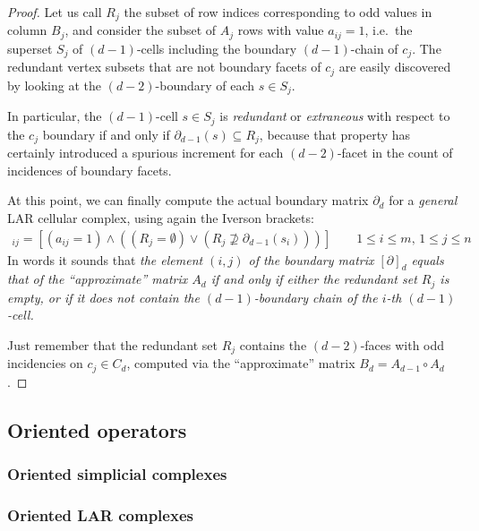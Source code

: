 \documentclass[11pt,oneside]{article}	%
\begin{document}
\begin{proof}
Let us call $R_j$ the subset of row indices corresponding to odd values in column $B_j$, and consider the subset of $A_j$ rows with value $a_{ij}=1$, i.e.~the superset $S_j$ of $(d-1)$-cells including the boundary $(d-1)$-chain of $c_j$. The redundant vertex subsets that are not boundary facets of $c_j$  are easily discovered by looking at the $(d-2)$-boundary of each $s\in S_j$.

In particular, the $(d-1)$-cell $s\in S_j$ is \emph{redundant} or \emph{extraneous} with respect to the $c_j$ boundary if and only if $\partial_{d-1}(s) \subseteq R_j$, because that property has certainly introduced a spurious increment for each $(d-2)$-facet in the count of incidences of boundary facets.

At this point, we can finally compute the actual boundary matrix $\partial_d$ for a \emph{general} LAR cellular complex, using again the Iverson brackets:
\begin{align*}
[\partial_d]_{ij} = [(a_{ij}=1) \wedge ((R_j=\emptyset) \vee (R_j \not\supseteq \partial_{d-1}(s_i)))]\qquad 1\leq i\leq m,\, 1\leq j\leq n
\end{align*}
In words it sounds that \emph{the element $(i,j)$ of the boundary matrix $[\partial]_d$ equals that of the ``approximate'' matrix $A_d$ if and only if either the redundant set $R_j$ is empty, or if it does not contain the $(d-1)$-boundary chain of the $i$-th $(d-1)$-cell.}

Just remember that the redundant set $R_j$ contains the $(d-2)$-faces with odd incidencies on $c_j\in C_d$, computed via the ``approximate'' matrix $B_d = A_{d-1}\circ A_d$.

\end{proof}  


\subsection{Oriented operators}

\subsubsection{Oriented simplicial complexes}

\subsubsection{Oriented LAR complexes}
\end{document}
